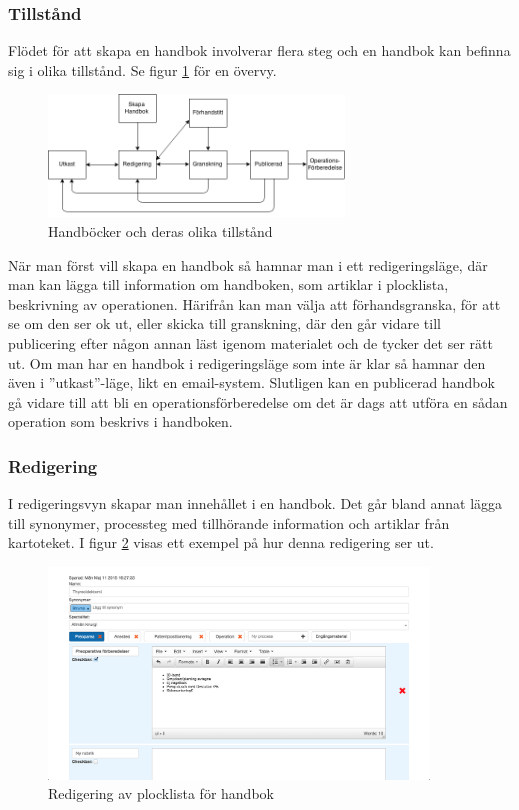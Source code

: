 \subsubsection{Tillstånd}
Flödet för att skapa en handbok involverar flera steg och en handbok kan befinna sig i olika tillstånd.
Se figur \ref{fig:model} för en övervy.

\begin{figure}
  \centering
  \includegraphics[width=0.7\textwidth]{images/model}
  \caption{Handböcker och deras olika tillstånd}
  \label{fig:model}
\end{figure}

När man först vill skapa en handbok så hamnar man i ett redigeringsläge,
där man kan lägga till information om handboken, som artiklar i plocklista,
beskrivning av operationen.
Härifrån kan man välja att förhandsgranska, för att se om den ser ok ut,
eller skicka till granskning, där den går vidare till publicering
efter någon annan läst igenom materialet och de tycker det ser rätt ut.
Om man har en handbok i redigeringsläge som inte är klar så hamnar den även i
''utkast''-läge, likt en email-system.
Slutligen kan en publicerad handbok gå vidare till att bli en
operationsförberedelse om det är dags att utföra en sådan operation
som beskrivs i handboken.

\subsubsection{Redigering}
I redigeringsvyn skapar man innehållet i en handbok. Det går bland annat lägga till synonymer, processteg med tillhörande information och artiklar från kartoteket. I figur \ref{fig:handboksredigering} visas ett exempel på hur denna redigering ser ut. 

\begin{figure}
  \centering
  \includegraphics[width=0.9\textwidth]{images/site/handboksredigering}
  \caption{Redigering av plocklista för handbok}
  \label{fig:handboksredigering}
\end{figure}


